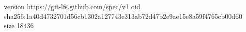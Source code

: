 version https://git-lfs.github.com/spec/v1
oid sha256:1a40d4732701d56cb1302a127743e313ab72d47b2e9ae15e8a59f4765cb00d60
size 18436
